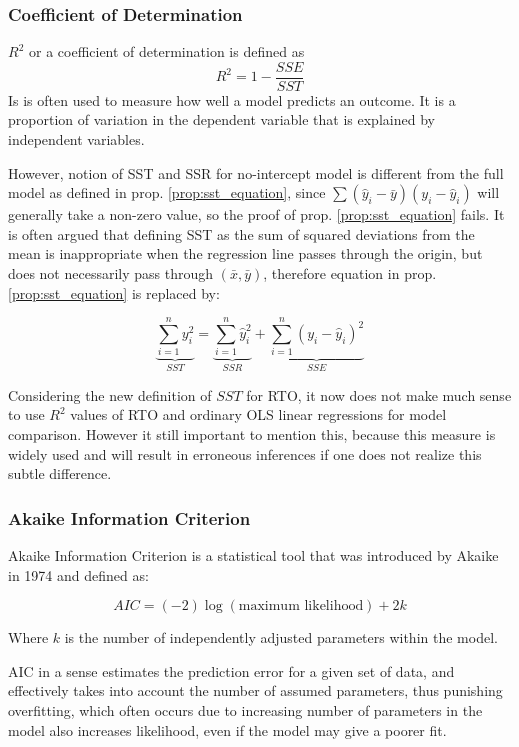 \documentclass[12pt,a4paper,oneside]{book} %
\begin{document}
\subsubsection{Coefficient of Determination}

	$R^2$ or a coefficient of determination is defined as $$R^2= 1 - \frac{SSE}{SST}$$
	Is is often used to measure how well a model predicts an outcome. It is a proportion of variation in the dependent variable that is explained by independent variables.
	
	However, notion of SST and SSR for no-intercept model is different from the full model as defined in prop. \ref{prop:sst_equation}, since $\sum (\hat{y}_i-\bar{y})(y_i-\hat{y}_i)$ will generally take a non-zero value, so the proof of prop. \ref{prop:sst_equation} fails. It is often argued \cite{eisenhauer2003regression} that defining SST as the sum of squared deviations from the mean is inappropriate when the regression line passes through the origin, but does not necessarily pass through $(\bar{x}, \bar{y})$,  therefore equation in prop. \ref{prop:sst_equation} is replaced by:
	
	$$\underbrace{\sum_{i=1}^{n} y_i^2}_{SST} = \underbrace{\sum_{i=1}^{n} \hat{y}_i^2}_{SSR} + \underbrace{\sum_{i=1}^{n} (y_i - \hat{y}_i)^2}_{SSE}$$
	
	Considering the new definition of $SST$ for RTO, it now does not make much sense to use $R^2$ values of RTO and ordinary OLS linear regressions for model comparison. However it still important to mention this, because this measure is widely used and will result in erroneous inferences if one does not realize this subtle difference.

\subsubsection{Akaike Information Criterion}

Akaike Information Criterion is a statistical tool that was introduced by Akaike in 1974 \cite{akaike1974new} and defined as:

\begin{equation*}
	AIC = (-2) \log (\text{maximum likelihood}) + 2 k
\end{equation*}

Where $k$ is the number of independently adjusted parameters within the model.

AIC in a sense estimates the prediction error for a given set of data, and effectively takes into account the number of assumed parameters, thus punishing overfitting, which often occurs due to increasing number of parameters in the model also increases likelihood, even if the model may give a poorer fit.
\end{document}
